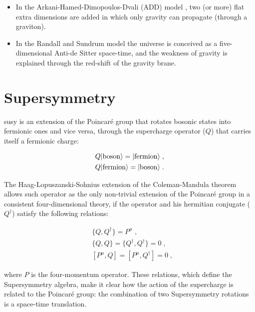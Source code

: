 \begin{itemize}
\item In the Arkani-Hamed-Dimopoulos-Dvali (ADD) model \cite{ArkaniHamed:1998rs}, two (or more) flat extra dimensions are added in which only gravity can propagate (through a graviton).
\item In the Randall and Sundrum model \cite{PhysRevLett.83.3370} the universe is conceived as a five-dimensional Anti-de Sitter space-time, and the weakness of gravity is explained through the red-shift of the gravity brane.
\end{itemize}


\section{Supersymmetry}
\label{sec:smsusy:susy}

\gls{susy} \cite{Wess:1974tw, Salam:1974ig} is an extension of the Poincar\'e group that rotates bosonic states into fermionic ones and vice versa, through the supercharge operator ($Q$) that carries itself a fermionic charge: 

\begin{equation}
\begin{aligned}
&Q |{\rm boson}\rangle = |{\rm fermion }\rangle \;, \\
&Q |{\rm fermion}\rangle = |{\rm boson }\rangle \; .
\end{aligned}
\end{equation}

\noindent The Haag-Lopuszanski-Sohnius extension of the Coleman-Mandula theorem \cite{HAAG1975257} allows such operator as the only non-trivial extension of the Poincar\'e group in a consistent four-dimensional theory, if the operator and his hermitian conjugate ($Q^\dagger$) satisfy the following relations:

\begin{equation}
\begin{aligned}
&\{ Q, Q^\dagger \} = P^\mu \; ,  \\
&\{ Q,Q \} = \{ Q^\dagger , Q^\dagger \} = 0  \;,  \\
&[ P^\mu , Q  ] = [P^\mu, Q^\dagger ] = 0 \; ,
\label{eq:susyalgth}
\end{aligned}
\end{equation}

\noindent where $P$ is the four-momentum operator. These relations, which define the Supersymmetry algebra, make it clear how the action of the supercharge is related to the Poincar\'e group: the combination of two Supersymmetry rotations is a space-time translation.

